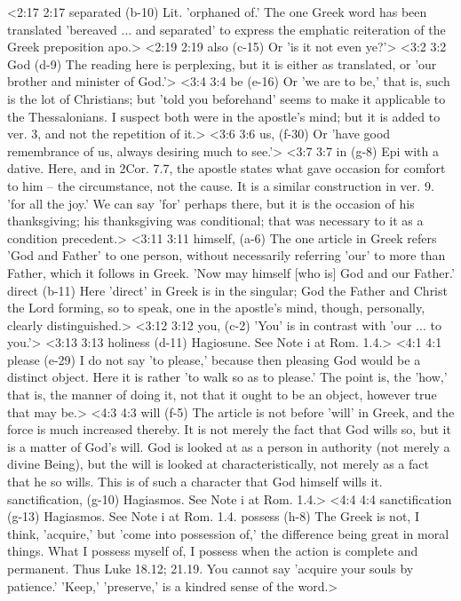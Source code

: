 <2:17 2:17  separated (b-10)  Lit. 'orphaned of.' The one Greek word has been translated  'bereaved ... and separated' to express the emphatic  reiteration of the Greek preposition apo.>
<2:19 2:19  also (c-15)  Or 'is it not even ye?'>
<3:2 3:2  God (d-9)  The reading here is perplexing, but it is either as  translated, or 'our brother and minister of God.'>
<3:4 3:4  be (e-16)  Or 'we are to be,' that is, such is the lot of Christians;  but 'told you beforehand' seems to make it applicable to the  Thessalonians. I suspect both were in the apostle's mind; but  it is added to ver. 3, and not the repetition of it.>
<3:6 3:6  us, (f-30)  Or 'have good remembrance of us, always desiring much to  see.'>
<3:7 3:7  in (g-8)  Epi with a dative. Here, and in 2Cor. 7.7, the apostle  states what gave occasion for comfort to him -- the  circumstance, not the cause. It is a similar construction in  ver. 9. 'for all the joy.' We can say 'for' perhaps there, but  it is the occasion of his thanksgiving; his thanksgiving was  conditional; that was necessary to it as a condition precedent.>
<3:11 3:11  himself, (a-6)  The one article in Greek refers 'God and Father' to one  person, without necessarily referring 'our' to more than  Father, which it follows in Greek. 'Now may himself [who is]  God and our Father.'
  direct (b-11)  Here 'direct' in Greek is in the singular; God the Father and  Christ the Lord forming, so to speak, one in the apostle's  mind, though, personally, clearly distinguished.>
<3:12 3:12  you, (c-2)  'You' is in contrast with 'our ... to you.'>
<3:13 3:13  holiness (d-11)  Hagiosune. See Note i at Rom. 1.4.>
<4:1 4:1  please (e-29)  I do not say 'to please,' because then pleasing God would be  a distinct object. Here it is rather 'to walk so as to please.'  The point is, the 'how,' that is, the manner of doing it, not  that it ought to be an object, however true that may be.>
<4:3 4:3  will (f-5)  The article is not before 'will' in Greek, and the force is  much increased thereby. It is not merely the fact that God  wills so, but it is a matter of God's will. God is looked at as  a person in authority (not merely a divine Being), but the will  is looked at characteristically, not merely as a fact that he  so wills. This is of such a character that God himself wills  it.
  sanctification, (g-10)  Hagiasmos. See Note i at Rom. 1.4.>
<4:4 4:4  sanctification (g-13)  Hagiasmos. See Note i at Rom. 1.4.
  possess (h-8)  The Greek is not, I think, 'acquire,' but 'come into  possession of,' the difference being great in moral things.  What I possess myself of, I possess when the action is complete  and permanent. Thus Luke 18.12; 21.19. You cannot say 'acquire  your souls by patience.' 'Keep,' 'preserve,' is a kindred sense  of the word.>
